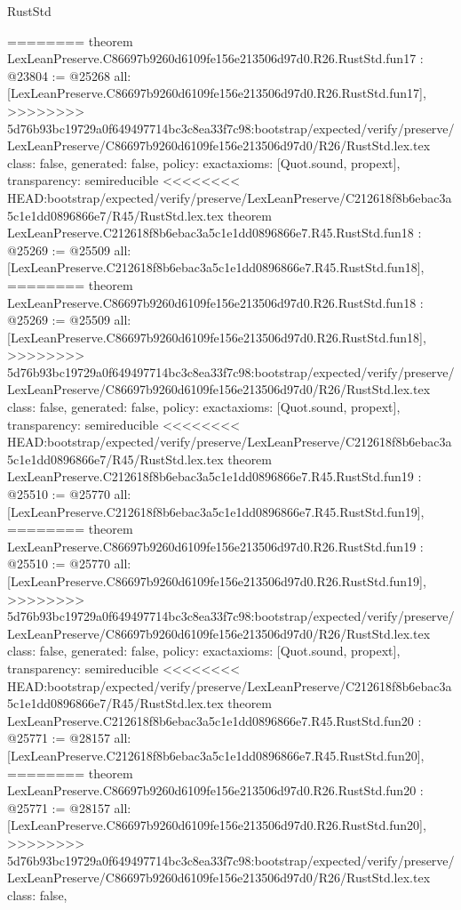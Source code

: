 \begin{lexlean}{RustStd}
\begin{coremodule}
{\begin{coremodule}
{{{{{{{{{{{{{{{{{{{{========
theorem LexLeanPreserve.C86697b9260d6109fe156e213506d97d0.R26.RustStd.fun17 : @23804 := @25268 {
  all: [LexLeanPreserve.C86697b9260d6109fe156e213506d97d0.R26.RustStd.fun17],
>>>>>>>> 5d76b93bc19729a0f649497714bc3c8ea33f7c98:bootstrap/expected/verify/preserve/LexLeanPreserve/C86697b9260d6109fe156e213506d97d0/R26/RustStd.lex.tex
  class: false,
  generated: false,
  policy: exact{axioms: [Quot.sound, propext]},
  transparency: semireducible
}
<<<<<<<< HEAD:bootstrap/expected/verify/preserve/LexLeanPreserve/C212618f8b6ebac3a5c1e1dd0896866e7/R45/RustStd.lex.tex
theorem LexLeanPreserve.C212618f8b6ebac3a5c1e1dd0896866e7.R45.RustStd.fun18 : @25269 := @25509 {
  all: [LexLeanPreserve.C212618f8b6ebac3a5c1e1dd0896866e7.R45.RustStd.fun18],
========
theorem LexLeanPreserve.C86697b9260d6109fe156e213506d97d0.R26.RustStd.fun18 : @25269 := @25509 {
  all: [LexLeanPreserve.C86697b9260d6109fe156e213506d97d0.R26.RustStd.fun18],
>>>>>>>> 5d76b93bc19729a0f649497714bc3c8ea33f7c98:bootstrap/expected/verify/preserve/LexLeanPreserve/C86697b9260d6109fe156e213506d97d0/R26/RustStd.lex.tex
  class: false,
  generated: false,
  policy: exact{axioms: [Quot.sound, propext]},
  transparency: semireducible
}
<<<<<<<< HEAD:bootstrap/expected/verify/preserve/LexLeanPreserve/C212618f8b6ebac3a5c1e1dd0896866e7/R45/RustStd.lex.tex
theorem LexLeanPreserve.C212618f8b6ebac3a5c1e1dd0896866e7.R45.RustStd.fun19 : @25510 := @25770 {
  all: [LexLeanPreserve.C212618f8b6ebac3a5c1e1dd0896866e7.R45.RustStd.fun19],
========
theorem LexLeanPreserve.C86697b9260d6109fe156e213506d97d0.R26.RustStd.fun19 : @25510 := @25770 {
  all: [LexLeanPreserve.C86697b9260d6109fe156e213506d97d0.R26.RustStd.fun19],
>>>>>>>> 5d76b93bc19729a0f649497714bc3c8ea33f7c98:bootstrap/expected/verify/preserve/LexLeanPreserve/C86697b9260d6109fe156e213506d97d0/R26/RustStd.lex.tex
  class: false,
  generated: false,
  policy: exact{axioms: [Quot.sound, propext]},
  transparency: semireducible
}
<<<<<<<< HEAD:bootstrap/expected/verify/preserve/LexLeanPreserve/C212618f8b6ebac3a5c1e1dd0896866e7/R45/RustStd.lex.tex
theorem LexLeanPreserve.C212618f8b6ebac3a5c1e1dd0896866e7.R45.RustStd.fun20 : @25771 := @28157 {
  all: [LexLeanPreserve.C212618f8b6ebac3a5c1e1dd0896866e7.R45.RustStd.fun20],
========
theorem LexLeanPreserve.C86697b9260d6109fe156e213506d97d0.R26.RustStd.fun20 : @25771 := @28157 {
  all: [LexLeanPreserve.C86697b9260d6109fe156e213506d97d0.R26.RustStd.fun20],
>>>>>>>> 5d76b93bc19729a0f649497714bc3c8ea33f7c98:bootstrap/expected/verify/preserve/LexLeanPreserve/C86697b9260d6109fe156e213506d97d0/R26/RustStd.lex.tex
  class: false,
}}}}}}}}}}}}}}}}}}}}}}}}
\end{coremodule}}
\end{coremodule}
\end{lexlean}
